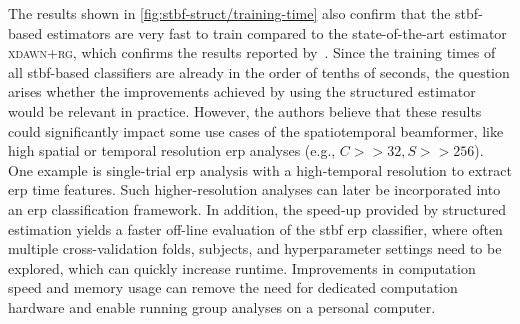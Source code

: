 	The results shown in \cref{fig:stbf-struct/training-time} also confirm that the
	\ac{stbf}-based estimators are very fast to train compared to the
	state-of-the-art estimator \textsc{xdawn+rg}, which confirms the results
  reported by~\textcite{Wittevrongel2016}.
	Since the training times of all \ac{stbf}-based classifiers are already in
	the order of tenths of seconds, the question arises whether the
	improvements achieved by using the structured estimator would be relevant in
	practice.
	However, the authors believe that these results could significantly impact some
	use cases of the spatiotemporal beamformer, like high spatial or temporal
  resolution \ac{erp} analyses (e.g., $C>>32, S>>256$).
	One example is single-trial \ac{erp} analysis with a high-temporal
	resolution to extract \ac{erp} time features.
	Such higher-resolution analyses can later be incorporated into an \ac{erp}
	classification framework.
	In addition, the speed-up provided by structured estimation yields a faster
	off-line evaluation of the \ac{stbf} \ac{erp} classifier, where often multiple cross-validation folds, subjects, and hyperparameter settings need to be explored, which can quickly increase runtime.
	Improvements in computation speed and memory usage can remove the need for dedicated computation hardware and enable running group analyses on a personal computer.


